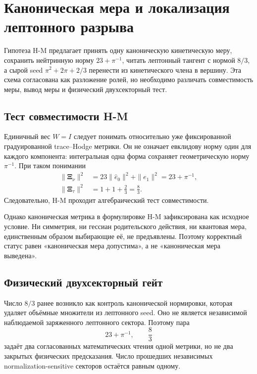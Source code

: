 \chapter{Каноническая мера и локализация лептонного разрыва}

Гипотеза H-M предлагает принять одну каноническую кинетическую меру,
сохранить нейтринную норму \(23+\pi^{-1}\), читать лептонный тангент с
нормой \(8/3\), а сырой seed \(\pi^2+2\pi+2/3\) перенести из кинетического
члена в вершину. Эта схема согласована как разложение ролей, но необходимо
различать совместимость меры, вывод меры и физический двухсекторный тест.

\section{Тест совместимости H-M}

Единичный вес \(W=I\) следует понимать относительно уже фиксированной
градуированной trace--Hodge метрики. Он не означает евклидову норму один
для каждого компонента: интегральная одна форма сохраняет геометрическую
норму \(\pi^{-1}\). При таком понимании
\begin{align}
 \|\boldsymbol\Xi_\nu\|^2
 &=23\|\widehat e_0\|^2+\|e_1\|^2
 =23+\pi^{-1},\\
 \|\boldsymbol\Xi_\tau\|^2
 &=1+1+\frac23=\frac83.
\end{align}
Следовательно, H-M проходит алгебраический тест совместимости.

Однако каноническая метрика в формулировке H-M зафиксирована как исходное
условие. Ни симметрия, ни гессиан родительского действия, ни квантовая мера,
единственным образом выбирающие её, не предъявлены. Поэтому корректный
статус равен «каноническая мера допустима», а не «каноническая мера
выведена».

\section{Физический двухсекторный гейт}

Число \(8/3\) ранее возникло как контроль канонической нормировки, которая
удаляет объёмные множители из лептонного seed. Оно не является независимой
наблюдаемой заряженного лептонного сектора. Поэтому пара
\begin{equation}
 23+\pi^{-1},
 \qquad
 \frac83
\end{equation}
задаёт два согласованных математических чтения одной метрики, но не два
закрытых физических предсказания. Число прошедших независимых
normalization-sensitive секторов остаётся равным одному.

